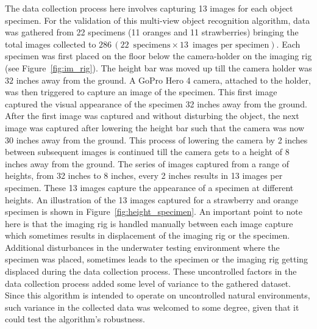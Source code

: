 The data collection process here involves capturing 13 images for each object specimen. For the validation of this multi-view object recognition algorithm, data was gathered from 22 specimens (11 oranges and 11 strawberries) bringing the total images collected to $286\, (22\enspace \text{specimens} \times 13\enspace \text{images per specimen})$. Each specimen was first placed on the floor below the camera-holder on the imaging rig (see Figure~\ref{fig:im_rig}). The height bar was moved up till the camera holder was $32$ inches away from the ground. A GoPro Hero 4 camera, attached to the holder, was then triggered to capture an image of the specimen. This first image captured the visual appearance of the specimen 32 inches away from the ground. After the first image was captured and without disturbing the object, the next image was captured after lowering the height bar such that the camera was now $30$ inches away from the ground.
This process of lowering the camera by 2 inches between subsequent images is continued till the camera gets to a height of $8$ inches away from the ground. 
The series of images captured from a range of heights, from 32 inches to 8 inches, every 2 inches results in 13 images per specimen. 
These 13 images capture the appearance of a specimen at different heights. An illustration of the 13 images captured for a strawberry and orange specimen is shown in Figure~\ref{fig:height_specimen}. An important point to note here is that the imaging rig is handled manually between each image capture which sometimes results in displacement of the imaging rig or the specimen. 
Additional disturbances in the underwater testing environment where the specimen was placed, sometimes leads to the specimen or the imaging rig getting displaced during the data collection process. These uncontrolled factors in the data collection process added some level of variance to the gathered dataset.
Since this algorithm is intended to operate on uncontrolled natural environments, such variance in the collected data was welcomed to some degree, given that it could test the algorithm's robustness.

